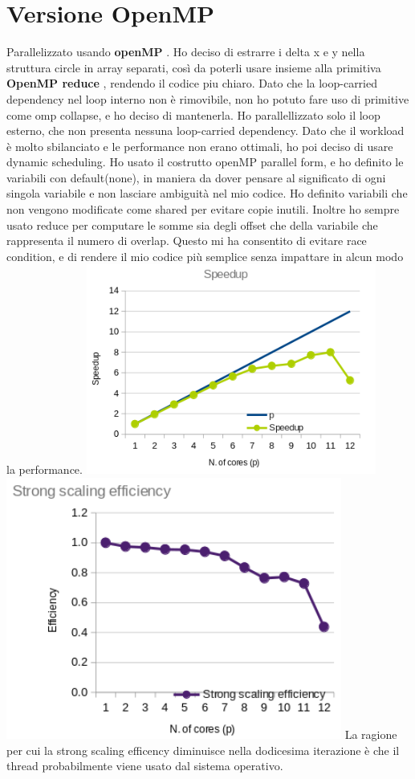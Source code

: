 \documentclass[a4paper,12pt, twoside]{report}
\begin{document}
\section*{Versione OpenMP}
Parallelizzato usando \textbf{openMP} \cite{openMP}.
Ho deciso di estrarre i delta x e y nella struttura circle in array separati, così da poterli usare insieme alla primitiva \textbf{OpenMP reduce} \cite{omp_reduce}, rendendo il codice piu chiaro.
Dato che la loop-carried dependency nel loop interno non è rimovibile, non ho potuto fare uso di primitive come omp collapse, e ho deciso di mantenerla.
Ho parallellizzato solo il loop esterno, che non presenta nessuna loop-carried dependency.
Dato che il workload è molto sbilanciato e le performance non erano ottimali, ho poi deciso di usare dynamic scheduling.
Ho usato il costrutto openMP parallel form, e ho definito le variabili con default(none), in maniera da dover pensare al significato di ogni singola variabile e non lasciare ambiguità nel mio codice. Ho definito variabili che non vengono modificate come shared per evitare copie inutili.
Inoltre ho sempre usato  reduce per computare le somme sia degli offset che della variabile che rappresenta il numero di overlap.
Questo mi ha consentito di evitare race condition, e di rendere il mio codice più semplice senza impattare in alcun modo la performance.
\newline
\includegraphics[scale=0.5]{images/omp_speedup.png}
\includegraphics[scale=0.5]{images/omp_strong.png}
La ragione per cui la strong scaling efficency diminuisce nella dodicesima iterazione è che il thread probabilmente viene usato dal sistema operativo.
\end{document}
